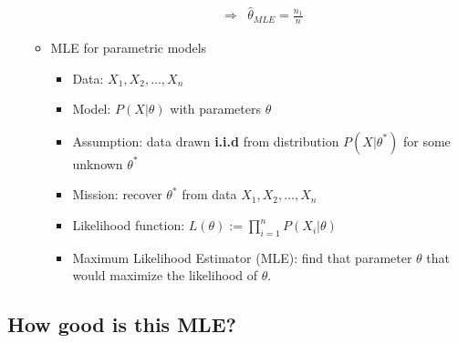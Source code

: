 \documentclass[letterpaper,10pt]{article}
\begin{document}
\begin{itemize}
\begin{itemize}
\begin{equation}
\begin{array}{rcl}
					 & \Rightarrow & \hat{\theta}_{MLE} = \frac{n_1}{n}
		\end{array}
		\end{equation}
		\item MLE for parametric models
		\begin{itemize}
			\item Data: $X_1, X_2, \dots, X_n$
			\item Model: $P(X|\theta)$ with parameters $\theta$
			\item Assumption: data drawn \textbf{i.i.d} from distribution $P(X|\theta^*)$ for some unknown $\theta^*$
			\item Mission: recover $\theta^*$ from data $X_1,X_2,\dots,X_n$
			\item Likelihood function: $L(\theta):=\prod_{i=1}^{n}{P(X_i|\theta)}$
			\item Maximum Likelihood Estimator (MLE): find that parameter $\theta$ that would maximize the likelihood of $\theta$.
		\end{itemize}
	\end{itemize}
\end{itemize}

\subsection{How good is this MLE?}
\end{document}
